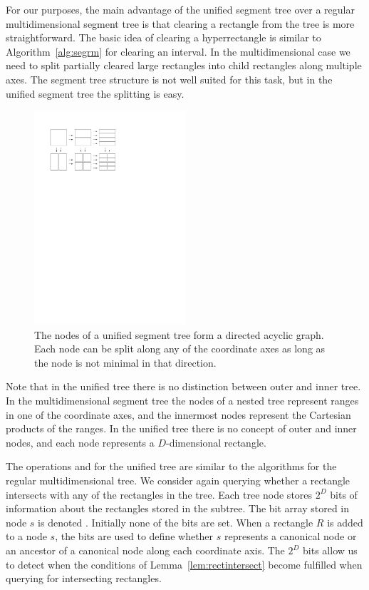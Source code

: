 \documentclass[english,gradu]{tktltiki2018}
\begin{document}
For our purposes, the main advantage of the unified segment tree over a regular multidimensional segment tree is that clearing a rectangle from the tree is more straightforward.
The basic idea of clearing a hyperrectangle is similar to Algorithm~\ref{alg:segrm} for clearing an interval.
In the multidimensional case we need to split partially cleared large rectangles into child rectangles along multiple axes.
The segment tree structure is not well suited for this task, but in the unified segment tree the splitting is easy.

\begin{figure}\centering
	\includegraphics[width=0.5\textwidth]{fig/unified}
	\caption{The nodes of a unified segment tree form a directed acyclic graph.
	Each node can be split along any of the coordinate axes as long as the node is not minimal in that direction.}\label{fig:unified}
\end{figure}

Note that in the unified tree there is no distinction between outer and inner tree.
In the multidimensional segment tree the nodes of a nested tree represent ranges in one of the coordinate axes, and the innermost nodes represent the Cartesian products of the ranges.
In the unified tree there is no concept of outer and inner nodes, and each node represents a $D$-dimensional rectangle.

The operations \adddt and \checkdt for the unified tree are similar to the algorithms for the regular multidimensional tree.
We consider again querying whether a rectangle intersects with any of the rectangles in the tree.
Each tree node stores $2^D$ bits of information about the rectangles stored in the subtree.
The bit array stored in node $s$ is denoted .
Initially none of the bits are set.
When a rectangle $R$ is added to a node $s$, the bits are used to define whether $s$ represents a canonical node or an ancestor of a canonical node along each coordinate axis.
The $2^D$ bits allow us to detect when the conditions of Lemma~\ref{lem:rectintersect} become fulfilled when querying for intersecting rectangles.
\end{document}
